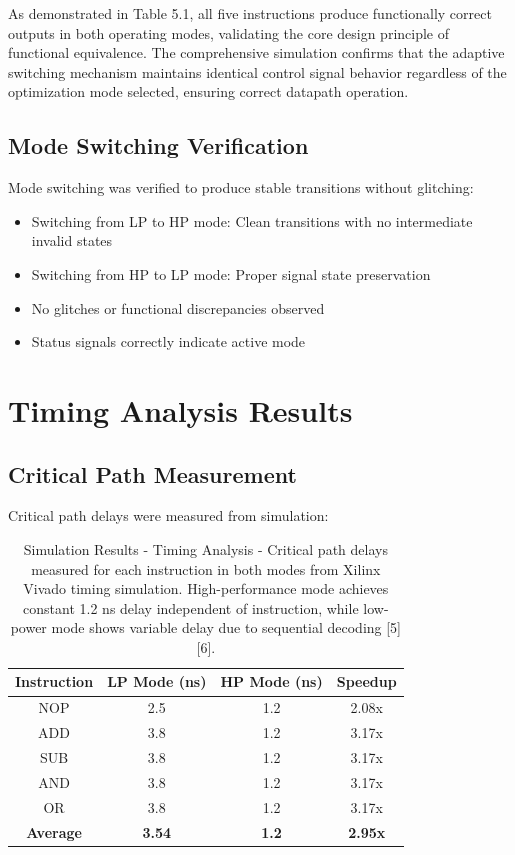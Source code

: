 \documentclass[15pt,a4paper]{report}
\begin{document}
As demonstrated in Table 5.1, all five instructions produce functionally correct outputs in both operating modes, validating the core design principle of functional equivalence. The comprehensive simulation confirms that the adaptive switching mechanism maintains identical control signal behavior regardless of the optimization mode selected, ensuring correct datapath operation.

\subsection{Mode Switching Verification}

Mode switching was verified to produce stable transitions without glitching:

\begin{itemize}
    \item Switching from LP to HP mode: Clean transitions with no intermediate invalid states
    \item Switching from HP to LP mode: Proper signal state preservation
    \item No glitches or functional discrepancies observed
    \item Status signals correctly indicate active mode
\end{itemize}

\section{Timing Analysis Results}

\subsection{Critical Path Measurement}

Critical path delays were measured from simulation:

\begin{table}[H]
    \centering
    \begin{tabular}{|c|c|c|c|}
        \hline
        \textbf{Instruction} & \textbf{LP Mode (ns)} & \textbf{HP Mode (ns)} & \textbf{Speedup} \\
        \hline
        NOP & 2.5 & 1.2 & 2.08x \\
        \hline
        ADD & 3.8 & 1.2 & 3.17x \\
        \hline
        SUB & 3.8 & 1.2 & 3.17x \\
        \hline
        AND & 3.8 & 1.2 & 3.17x \\
        \hline
        OR & 3.8 & 1.2 & 3.17x \\
        \hline
        \textbf{Average} & \textbf{3.54} & \textbf{1.2} & \textbf{2.95x} \\
        \hline
    \end{tabular}
    \label{tab:timing_results}
    \caption{Simulation Results - Timing Analysis - Critical path delays measured for each instruction in both modes from Xilinx Vivado timing simulation. High-performance mode achieves constant 1.2 ns delay independent of instruction, while low-power mode shows variable delay due to sequential decoding [5][6].}
\end{table}
\end{document}
